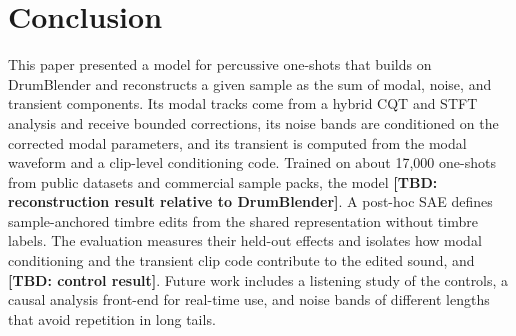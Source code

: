 \section{Conclusion}
\label{sec:conclusion}
This paper presented a model for percussive one-shots that builds on DrumBlender and reconstructs a given sample as the sum of modal, noise, and transient components.
Its modal tracks come from a hybrid CQT and STFT analysis and receive bounded corrections, its noise bands are conditioned on the corrected modal parameters, and its transient is computed from the modal waveform and a clip-level conditioning code.
Trained on about 17,000 one-shots from public datasets and commercial sample packs, the model \textbf{[TBD: reconstruction result relative to DrumBlender]}.
A post-hoc SAE defines sample-anchored timbre edits from the shared representation without timbre labels.
The evaluation measures their held-out effects and isolates how modal conditioning and the transient clip code contribute to the edited sound, and \textbf{[TBD: control result]}.
Future work includes a listening study of the controls, a causal analysis front-end for real-time use, and noise bands of different lengths that avoid repetition in long tails.
